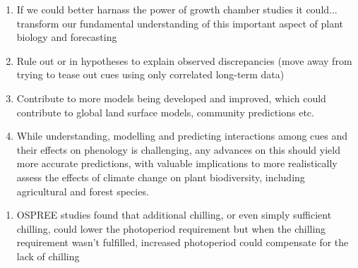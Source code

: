 \documentclass[11pt,letterpaper]{article}
\begin{document}
\begin{enumerate}
\begin{enumerate}
\item If we could better harnass the power of growth chamber studies it could... transform our fundamental understanding of this important aspect of plant biology and forecasting
\item Rule out or in hypotheses to explain observed discrepancies (move away from trying to tease out cues using only correlated long-term data)
\item Contribute to more models being developed and improved, which could contribute to global land surface models, community predictions etc. 
\item While understanding, modelling and predicting interactions among cues and their effects on phenology is challenging, any advances on this should yield more accurate predictions, with valuable implications to more realistically assess the effects of climate change on plant biodiversity, including agricultural and forest species. %
\end{enumerate}
\end{enumerate}

\begin{enumerate}
\item OSPREE studies found that additional chilling, or even simply sufficient chilling, could lower the photoperiod requirement but when the chilling requirement wasn't fulfilled, increased photoperiod could compensate for the lack of chilling \citep{Nienstaedt:1966aa,Myking:1995,Falusi:1996aa,Hawkins:2012}
\end{enumerate}


\newpage
\end{document}
